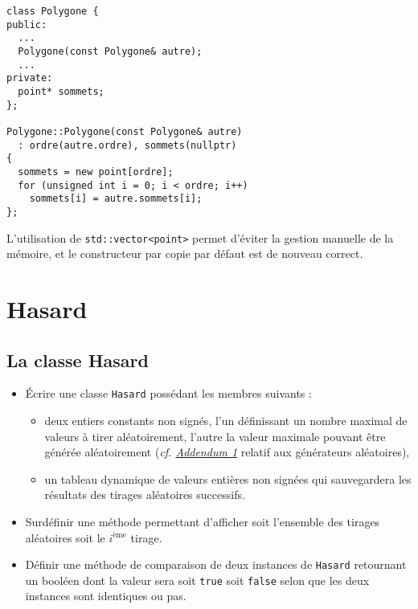 \documentclass{book}
\newcommand{\inline}[1]{\texttt{#1}}
\begin{document}
\begin{correction}
\begin{verbatim}
class Polygone {
public:
  ...
  Polygone(const Polygone& autre);
  ...
private:
  point* sommets;
};

Polygone::Polygone(const Polygone& autre)
  : ordre(autre.ordre), sommets(nullptr)
{
  sommets = new point[ordre];
  for (unsigned int i = 0; i < ordre; i++)
    sommets[i] = autre.sommets[i];
};
\end{verbatim}

L'utilisation de \inline{std::vector<point>} permet d'éviter la gestion manuelle de la mémoire, et le constructeur par copie par défaut est de nouveau correct.

\end{correction}


\section{Hasard}

\subsection{La classe Hasard}

\begin{itemize}
\item Écrire une classe \texttt{Hasard} possédant les membres suivants :

\begin{itemize}
\item deux entiers constants non signés, l'un définissant un nombre maximal de valeurs
  à tirer aléatoirement, l'autre la valeur maximale pouvant être générée aléatoirement
  (\emph{cf. \hyperref[sec:orgheadline1]{Addendum 1}} relatif aux générateurs aléatoires),

\item un tableau dynamique de valeurs entières non signées qui sauvegardera les résultats
  des tirages aléatoires successifs.
\end{itemize}



\item Surdéfinir une méthode permettant d'afficher soit l'ensemble des tirages aléatoires soit
  le \(i^{\text{ème}}\) tirage.

\item Définir une méthode de comparaison de deux instances de \texttt{Hasard} retournant un booléen
  dont la valeur sera soit \texttt{true} soit \texttt{false} selon que les deux instances sont
  identiques ou pas.
\end{itemize}
\end{document}
